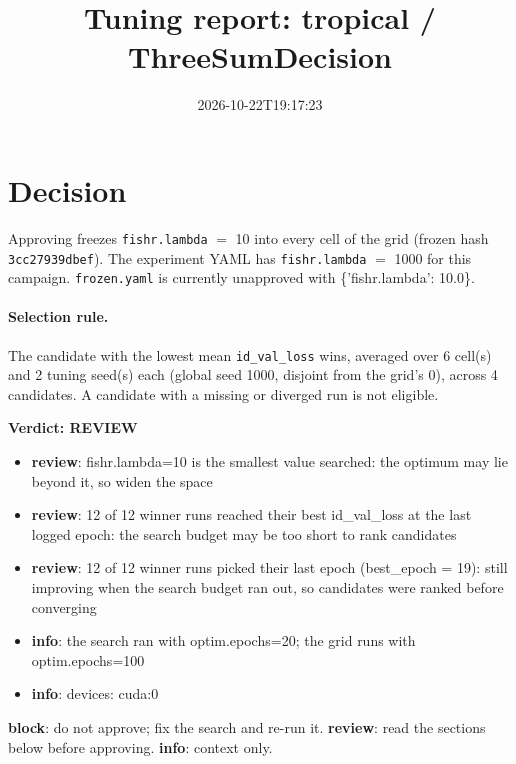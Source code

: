\documentclass[10pt]{article}
\title{Tuning report: tropical / ThreeSumDecision}
\date{2026-10-22T19:17:23}
\begin{document}
\maketitle

\section{Decision}
Approving freezes
\texttt{fishr.lambda} $=$ 10 into every cell of the grid (frozen hash \texttt{3cc27939dbef}).
The experiment YAML has
\texttt{fishr.lambda} $=$ 1000 for this campaign.
\texttt{frozen.yaml} is currently unapproved with \{'fishr.lambda': 10.0\}.

\paragraph{Selection rule.} The candidate with the lowest mean \texttt{id\_val\_loss} wins, averaged over 6 cell(s) and 2 tuning seed(s) each (global seed 1000, disjoint from the grid's 0), across 4 candidates. A candidate with a missing or diverged run is not eligible.

\begin{framed}
\noindent\textbf{Verdict: \textcolor{orange!85!black}{REVIEW}}
\begin{itemize}\setlength\itemsep{0pt}
\item \textbf{review}: fishr.lambda=10 is the smallest value searched: the optimum may lie beyond it, so widen the space
\item \textbf{review}: 12 of 12 winner runs reached their best id\_val\_loss at the last logged epoch: the search budget may be too short to rank candidates
\item \textbf{review}: 12 of 12 winner runs picked their last epoch (best\_epoch = 19): still improving when the search budget ran out, so candidates were ranked before converging
\item \textbf{info}: the search ran with optim.epochs=20; the grid runs with optim.epochs=100
\item \textbf{info}: devices: cuda:0
\end{itemize}
\end{framed}
\noindent\textbf{block}: do not approve; fix the search and re-run it. \textbf{review}: read the sections below before approving. \textbf{info}: context only.
\end{document}

